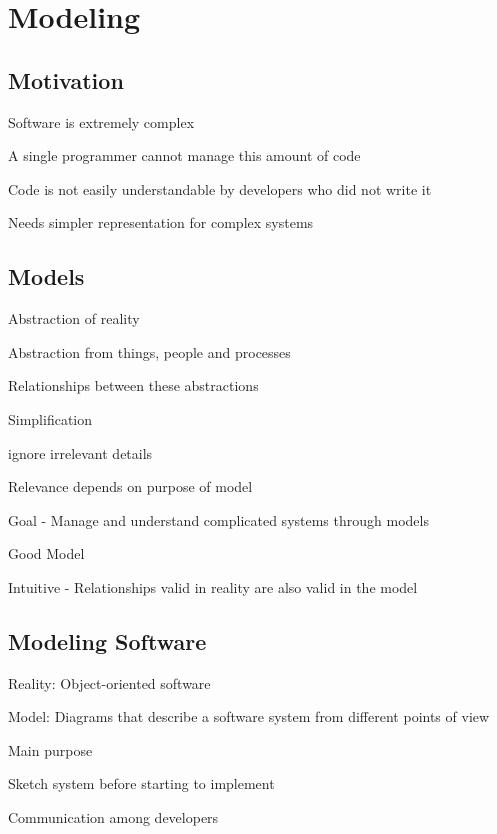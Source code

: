 \section{Modeling}

\subsection{Motivation}
\enumstart
	\item Software is extremely complex
	\item A single programmer cannot manage this amount of code
	\item Code is not easily understandable by developers who did not write it
	\item Needs simpler representation for complex systems
\enumend

\subsection{Models}
\enumstart
	\item Abstraction of reality
	\item Abstraction from things, people and processes
	\item Relationships between these abstractions
	\item Simplification
	\enumstart
		\item ignore irrelevant details
		\item Relevance depends on purpose of model
	\enumend
	\item Goal - Manage and understand complicated systems through models
	\item Good Model
	\enumstart
		\item Intuitive - Relationships valid in reality are also valid in the model
	\enumend
\enumend

\subsection{Modeling Software}
\enumstart
\item Reality: Object-oriented software
\item Model: Diagrams that describe a software system from different points of view
\item Main purpose
\enumstart
	\item Sketch system before starting to implement
	\item Communication among developers
\enumend
\enumend

